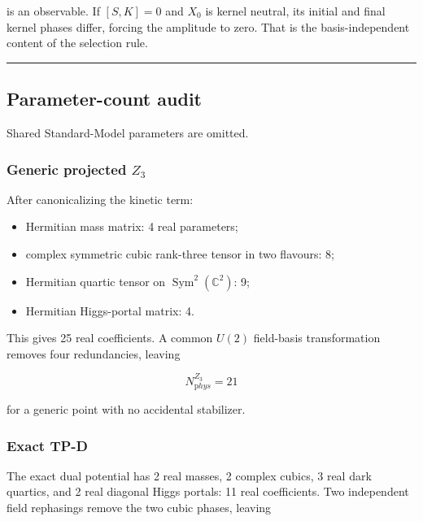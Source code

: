 \documentclass[
]{article}
\providecommand{\tightlist}{%
  \setlength{\itemsep}{0pt}\setlength{\parskip}{0pt}}
\begin{document}
is an observable. If \([S,K]=0\) and \(X_0\) is kernel neutral, its
initial and final kernel phases differ, forcing the amplitude to zero.
That is the basis-independent content of the selection rule.

\begin{center}\rule{0.5\linewidth}{0.5pt}\end{center}

\hypertarget{parameter-count-audit}{%
\subsection{Parameter-count audit}\label{parameter-count-audit}}

Shared Standard-Model parameters are omitted.

\hypertarget{generic-projected-z_3}{%
\subsubsection{\texorpdfstring{Generic projected
\(Z_3\)}{Generic projected Z\_3}}\label{generic-projected-z_3}}

After canonicalizing the kinetic term:

\begin{itemize}
\tightlist
\item
  Hermitian mass matrix: 4 real parameters;
\item
  complex symmetric cubic rank-three tensor in two flavours: 8;
\item
  Hermitian quartic tensor on \(\operatorname{Sym}^2(\mathbb C^2)\): 9;
\item
  Hermitian Higgs-portal matrix: 4.
\end{itemize}

This gives 25 real coefficients. A common \(U(2)\) field-basis
transformation removes four redundancies, leaving

\[
N_{\mathrm phys}^{Z_3}=21
\]

for a generic point with no accidental stabilizer.

\hypertarget{exact-tp-d}{%
\subsubsection{Exact TP-D}\label{exact-tp-d}}

The exact dual potential has 2 real masses, 2 complex cubics, 3 real
dark quartics, and 2 real diagonal Higgs portals: 11 real coefficients.
Two independent field rephasings remove the two cubic phases, leaving
\end{document}
